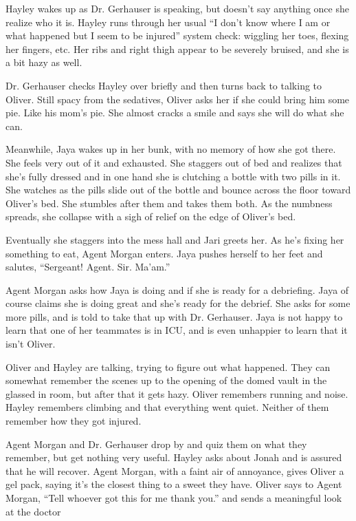 Hayley wakes up as Dr. Gerhauser is speaking, but doesn't say anything once she realize who it is.  Hayley runs through her usual ``I don't know where I am or what happened but I seem to be injured'' system check: wiggling her toes, flexing her fingers, etc.  Her ribs and right thigh appear to be severely bruised, and she is a bit hazy as well.



Dr. Gerhauser checks Hayley over briefly and then turns back to talking to Oliver.  Still spacy from the sedatives, Oliver asks her if she could bring him some pie.  Like his mom's pie.  She almost cracks a smile and says she will do what she can.



Meanwhile, Jaya wakes up in her bunk, with no memory of how she got there.  She feels very out of it and exhausted.  She staggers out of bed and realizes that she's fully dressed and in one hand she is clutching a bottle with two pills in it. She watches as the pills slide out of the bottle and bounce across the floor toward Oliver's bed.  She stumbles after them and takes them both.  As the numbness spreads, she collapse with a sigh of relief on the edge of Oliver's bed.



Eventually she staggers into the mess hall and Jari greets her.  As he's fixing her something to eat, Agent Morgan enters.  Jaya pushes herself to her feet and salutes, ``Sergeant!  Agent.  Sir.  Ma'am.''



Agent Morgan asks how Jaya is doing and if she is ready for a debriefing.  Jaya of course claims she is doing great and she's ready for the debrief.  She asks for some more pills, and is told to take that up with Dr. Gerhauser.  Jaya is not happy to learn that one of her teammates is in ICU, and is even unhappier to learn that it isn't Oliver.  



Oliver and Hayley are talking, trying to figure out what happened.  They can somewhat remember the scenes up to the opening of the domed vault in the glassed in room, but after that it gets hazy.  Oliver remembers running and noise.  Hayley remembers climbing and that everything went quiet.  Neither of them remember how they got injured.



Agent Morgan and Dr. Gerhauser drop by and quiz them on what they remember, but get nothing very useful.  Hayley asks about Jonah and is assured that he will recover.  Agent Morgan, with a faint air of annoyance, gives Oliver a gel pack, saying it's the closest thing to a sweet they have.  Oliver says to Agent Morgan, ``Tell whoever got this for me thank you.''  and sends a meaningful look at the doctor



